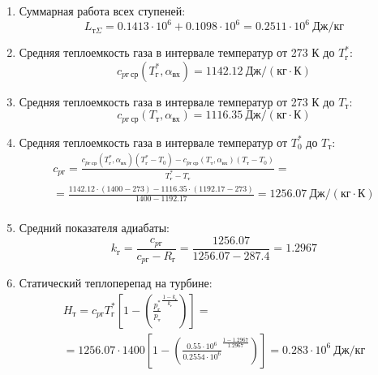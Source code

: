 \documentclass[a4paper,10pt]{article}
\begin{document}
    
    \begin{enumerate}

        \item Суммарная работа всех ступеней:
        \[
            L_{т\Sigma} = 0.1413\cdot 10^6+0.1098\cdot 10^6 = 0.2511 \cdot 10^6 \ Дж/кг
        \]

        \item Средняя теплоемкость газа в интервале температур от 273 К до $T_г^*$:
        \[
            c_{pг\ ср} (T_г^*, \alpha_{вх}) =
            1142.12 \ Дж/(кг \cdot К)
        \]

        \item Средняя теплоемкость газа в интервале температур от 273 К до $T_т$:
        \[
            c_{pг\ ср} (T_т, \alpha_{вх}) =
            1116.35 \ Дж/(кг \cdot К)
        \]

        \item Средняя теплоемкость газа в интервале температур от $T_0^*$ до $T_т$:
        \begin{gather*}
            c_{pг} = \frac{
		         c_{pг\ ср} (T_г^*, \alpha_{вх}) (T_г^* - T_0) - c_{pг\ ср} (T_{т}, \alpha_{вх})(T_т - T_0)
		    }{
		        T_г^* - T_т} =\\
            =\frac{
                1142.12 \cdot
                (1400 - 273) -
		        1116.35 \cdot
                (1192.17 - 273)
		    }{
		        1400 - 1192.17} =
		    1256.07 \ Дж / (кг \cdot К)\\
        \end{gather*}

        \item Средний показателя адиабаты:
        \[
            k_г = \frac{c_{pг}}{c_{pг} - R_г} =
                \frac{
                    1256.07
                }{
                    1256.07 - 287.4
                }
            = 1.2967
        \]

        \item Статический теплоперепад на турбине:
        \begin{gather*}
            H_т = c_{pг} T_г^* \left[
                        1 - \left(
                                \frac{p_г^*}{p_т} ^
                                \frac{1 - k_г}{k_г}
                    \right)
                \right] =\\
            = 1256.07 \cdot 1400
                \left[
                    1 - \left(
                            \frac{
                                0.55 \cdot 10^6
                            }{
                                0.2554 \cdot 10^6 } ^
                            \frac{ 1 - 1.2967 }{ 1.2967 }
                    \right)
            \right] =
            0.283 \cdot 10^6 \ Дж/кг\\
        \end{gather*}


\end{enumerate}
\end{document}
